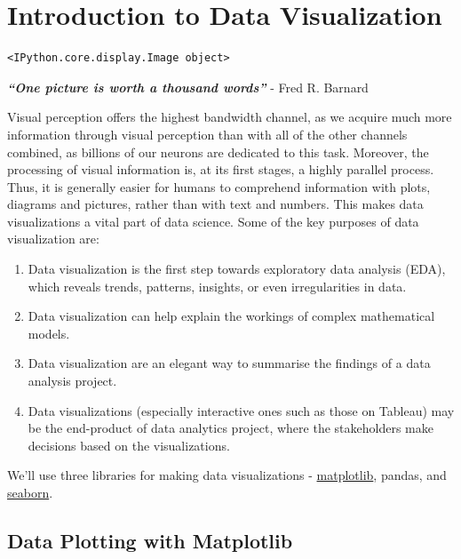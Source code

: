 \documentclass[
  letterpaper,
  DIV=11,
  numbers=noendperiod]{scrreprt}
\providecommand{\tightlist}{%
  \setlength{\itemsep}{0pt}\setlength{\parskip}{0pt}}\usepackage{longtable,booktabs,array}
\begin{document}
\hypertarget{introduction-to-data-visualization}{%
\chapter{Introduction to Data
Visualization}\label{introduction-to-data-visualization}}

\begin{verbatim}
<IPython.core.display.Image object>
\end{verbatim}

\textbf{\emph{``One picture is worth a thousand words''}} - Fred R.
Barnard

Visual perception offers the highest bandwidth channel, as we acquire
much more information through visual perception than with all of the
other channels combined, as billions of our neurons are dedicated to
this task. Moreover, the processing of visual information is, at its
first stages, a highly parallel process. Thus, it is generally easier
for humans to comprehend information with plots, diagrams and pictures,
rather than with text and numbers. This makes data visualizations a
vital part of data science. Some of the key purposes of data
visualization are:

\begin{enumerate}
\def\labelenumi{\arabic{enumi}.}
\tightlist
\item
  Data visualization is the first step towards exploratory data analysis
  (EDA), which reveals trends, patterns, insights, or even
  irregularities in data.
\item
  Data visualization can help explain the workings of complex
  mathematical models.
\item
  Data visualization are an elegant way to summarise the findings of a
  data analysis project.
\item
  Data visualizations (especially interactive ones such as those on
  Tableau) may be the end-product of data analytics project, where the
  stakeholders make decisions based on the visualizations.
\end{enumerate}

We'll use three libraries for making data visualizations -
\href{https://matplotlib.org/}{matplotlib}, pandas, and
\href{https://seaborn.pydata.org/}{seaborn}.

\hypertarget{data-plotting-with-matplotlib}{%
\section{Data Plotting with
Matplotlib}\label{data-plotting-with-matplotlib}}
\end{document}
